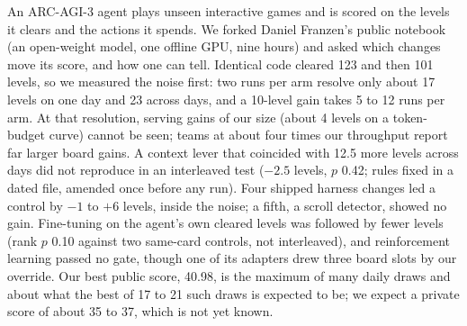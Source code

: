 An ARC-AGI-3 agent plays unseen interactive games and is scored on the levels it clears and the actions it spends.
We forked Daniel Franzen's public notebook (an open-weight model, one offline GPU, nine hours) and asked which changes move its score, and how one can tell.
Identical code cleared 123 and then 101 levels, so we measured the noise first: two runs per arm resolve only about 17 levels on one day and 23 across days, and a 10-level gain takes 5 to 12 runs per arm. %
At that resolution, serving gains of our size (about 4 levels on a token-budget curve) cannot be seen; teams at about four times our throughput report far larger board gains. %
A context lever that coincided with 12.5 more levels across days did not reproduce in an interleaved test ($-2.5$ levels, $p$ 0.42; rules fixed in a dated file, amended once before any run). %
Four shipped harness changes led a control by $-1$ to $+6$ levels, inside the noise; a fifth, a scroll detector, showed no gain. %
Fine-tuning on the agent's own cleared levels was followed by fewer levels (rank $p$ 0.10 against two same-card controls, not interleaved), and reinforcement learning passed no gate, though one of its adapters drew three board slots by our override. %
Our best public score, 40.98, is the maximum of many daily draws and about what the best of 17 to 21 such draws is expected to be; we expect a private score of about 35 to 37, which is not yet known. %
